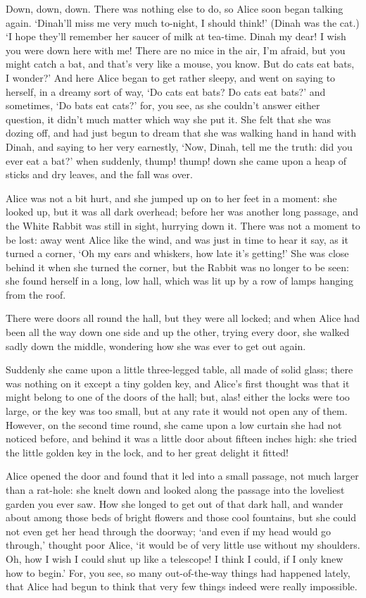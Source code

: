 \documentclass[12pt]{book}
\begin{document}
\begin{Parallel}[p]{}{}
{Down, down, down. There was nothing else to do, so Alice soon began talking again. ‘Dinah’ll miss me very much to-night, I should think!’ (Dinah was the cat.) ‘I hope they’ll remember her saucer of milk at tea-time. Dinah my dear! I wish you were down here with me! There are no mice in the air, I’m afraid, but you might catch a bat, and that’s very like a mouse, you know. But do cats eat bats, I wonder?’ And here Alice began to get rather sleepy, and went on saying to herself, in a dreamy sort of way, ‘Do cats eat bats? Do cats eat bats?’ and sometimes, ‘Do bats eat cats?’ for, you see, as she couldn’t answer either question, it didn’t much matter which way she put it. She felt that she was dozing off, and had just begun to dream that she was walking hand in hand with Dinah, and saying to her very earnestly, ‘Now, Dinah, tell me the truth: did you ever eat a bat?’ when suddenly, thump! thump! down she came upon a heap of sticks and dry leaves, and the fall was over.

Alice was not a bit hurt, and she jumped up on to her feet in a moment: she looked up, but it was all dark overhead; before her was another long passage, and the White Rabbit was still in sight, hurrying down it. There was not a moment to be lost: away went Alice like the wind, and was just in time to hear it say, as it turned a corner, ‘Oh my ears and whiskers, how late it’s getting!’ She was close behind it when she turned the corner, but the Rabbit was no longer to be seen: she found herself in a long, low hall, which was lit up by a row of lamps hanging from the roof.

There were doors all round the hall, but they were all locked; and when Alice had been all the way down one side and up the other, trying every door, she walked sadly down the middle, wondering how she was ever to get out again.

Suddenly she came upon a little three-legged table, all made of solid glass; there was nothing on it except a tiny golden key, and Alice’s first thought was that it might belong to one of the doors of the hall; but, alas! either the locks were too large, or the key was too small, but at any rate it would not open any of them. However, on the second time round, she came upon a low curtain she had not noticed before, and behind it was a little door about fifteen inches high: she tried the little golden key in the lock, and to her great delight it fitted!

Alice opened the door and found that it led into a small passage, not much larger than a rat-hole: she knelt down and looked along the passage into the loveliest garden you ever saw. How she longed to get out of that dark hall, and wander about among those beds of bright flowers and those cool fountains, but she could not even get her head through the doorway; ‘and even if my head would go through,’ thought poor Alice, ‘it would be of very little use without my shoulders. Oh, how I wish I could shut up like a telescope! I think I could, if I only knew how to begin.’ For, you see, so many out-of-the-way things had happened lately, that Alice had begun to think that very few things indeed were really impossible.

}
\end{Parallel}
\end{document}
